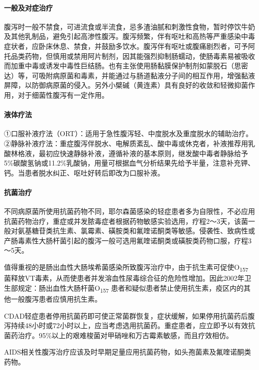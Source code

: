 \paragraph{一般及对症治疗}

腹泻时一般不禁食，可进流食或半流食，忌多渣油腻和刺激性食物，暂时停饮牛奶及其他乳制品，避免引起高渗性腹泻。腹泻频繁，伴有呕吐和高热等严重感染中毒症状者，应卧床休息、禁食，并鼓励多饮水。腹泻伴有呕吐或腹痛剧烈者，可予阿托品类药物，但慎用或禁用阿片制剂，因其能强烈抑制肠蠕动，使肠毒素易被吸收而加重中毒或诱发中毒性巨结肠。也有主张使用肠黏膜保护制剂如蒙脱石（思密达）等，可吸附病原菌和毒素，并能通过与肠道黏液分子间的相互作用，增强黏液屏障，以防御病原菌的侵入。另外小檗碱（黄连素）具有良好的收敛和轻微抑菌作用，对于细菌性腹泻有一定作用。

\paragraph{液体疗法}

①口服补液疗法（ORT）：适用于急性腹泻轻、中度脱水及重度脱水的辅助治疗。②静脉补液疗法：重症腹泻伴脱水、电解质紊乱、酸中毒或休克者，补液推荐用乳酸林格液，最初应快速静脉补液，遵循补液的基本原则，继发酸中毒者静脉给予5\%碳酸氢钠或11.2\%乳酸钠，用量可根据血气分析结果先给予半量，注意补充钾、钙。当患者脱水纠正、呕吐好转后即改为口服补液。

\paragraph{抗菌治疗}

不同病原菌所使用抗菌药物不同，耶尔森菌感染的轻症患者多为自限性，不必应用抗菌药物治疗，重症或并发脓毒症者根据药物敏感实验选用，疗程2～3天，该菌一般对氨基糖苷类抗生素、氯霉素、磺胺类和氟喹诺酮类等敏感。侵袭性、致病性或产肠毒素性大肠杆菌引起的腹泻一般可选用氟喹诺酮类或磺胺类药物口服，疗程3～5天。

值得重视的是肠出血性大肠埃希菌感染所致腹泻治疗中，由于抗生素可促使O\textsubscript{157}
菌释放VT毒素，从而使患者并发溶血性尿毒综合征的危险性增加。因此2002年卫生部规定：肠出血性大肠杆菌O\textsubscript{157}
患者和疑似患者禁止使用抗生素，疫区内的其他一般腹泻患者应慎用抗生素。

CDAD轻症患者停用抗菌药即可使正常菌群恢复，症状缓解，如果停用抗菌药后腹泻持续48小时或72小时以上，应当考虑选用抗菌药。重症患者，应立即予以有效抗菌药治疗。95\%以上的艰难梭菌对甲硝唑和万古霉素敏感，而且疗效相仿。

AIDS相关性腹泻治疗应该及时早期足量应用抗菌药物，如头孢菌素及氟喹诺酮类药物。

